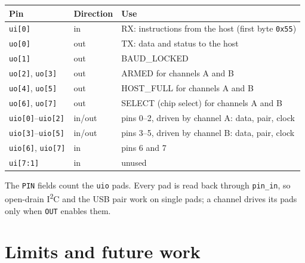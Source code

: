 \documentclass[11pt,a4paper]{article}
\newcommand{\sig}[1]{\texttt{#1}}
\begin{document}
\begin{center}
\begin{tabularx}{\linewidth}{@{}llX@{}}
\toprule
Pin & Direction & Use \\
\midrule
\sig{ui[0]} & in & RX: instructions from the host (first byte \sig{0x55}) \\
\sig{uo[0]} & out & TX: data and status to the host \\
\sig{uo[1]} & out & BAUD\_LOCKED \\
\sig{uo[2]}, \sig{uo[3]} & out & ARMED for channels A and B \\
\sig{uo[4]}, \sig{uo[5]} & out & HOST\_FULL for channels A and B \\
\sig{uo[6]}, \sig{uo[7]} & out & SELECT (chip select) for channels A and B \\
\sig{uio[0]}--\sig{uio[2]} & in/out & pins 0--2, driven by channel A: data, pair, clock \\
\sig{uio[3]}--\sig{uio[5]} & in/out & pins 3--5, driven by channel B: data, pair, clock \\
\sig{uio[6]}, \sig{uio[7]} & in & pins 6 and 7 \\
\sig{ui[7:1]} & in & unused \\
\bottomrule
\end{tabularx}
\end{center}

The \sig{PIN} fields count the \sig{uio} pads. Every pad is read back through \sig{pin\_in}, so open-drain I\textsuperscript{2}C and the USB pair work on single pads; a channel drives its pads only when \sig{OUT} enables them.

\section{Limits and future work}
\end{document}
